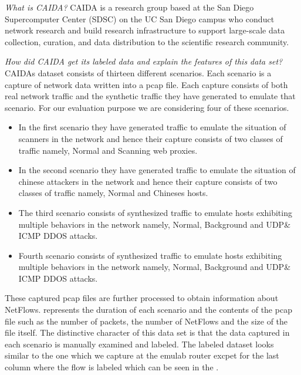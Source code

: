 \textit{What is CAIDA?} CAIDA is a research group based at the San Diego Supercomputer Center (SDSC) on the UC San Diego campus who conduct network research and build research infrastructure to support large-scale data collection, curation, and data distribution to the scientific research community.

\textit{How did CAIDA get its labeled data and explain the features of this data set? }
CAIDAs dataset consists of thirteen different scenarios. Each scenario is a capture of network data written into a pcap file. Each capture consists of both real network traffic and the synthetic traffic they have generated to emulate that scenario. For our evaluation purpose we are considering four of these scenarios.

\begin{itemize}
	\item In the first scenario they have generated traffic to emulate the situation of scanners in the network and hence their capture consists of two classes of traffic namely,  Normal and Scanning web proxies.
	\item In the second scenario they have generated traffic to emulate the situation of chinese attackers in the network and hence their capture consists of two classes of traffic namely,  Normal and Chineses hosts.
	\item The third scenario consists of synthesized traffic to emulate hosts exhibiting multiple behaviors in the network namely, Normal, Background and UDP\& ICMP DDOS attacks.
	\item Fourth scenario consists of synthesized traffic to emulate hosts exhibiting multiple behaviors in the network namely, Normal, Background and UDP\& ICMP DDOS attacks.

\end{itemize}

 These captured pcap files are further processed to obtain information about NetFlows.  represents the duration of each scenario and the contents of the pcap file such as the number of packets, the number of NetFlows and the size of the file itself. The distinctive character of this data set is that the data captured in each scenario is manually examined and labeled. The labeled dataset looks similar to the one which we capture at the emulab router excpet for the last column where the flow is labeled which can be seen in the .


